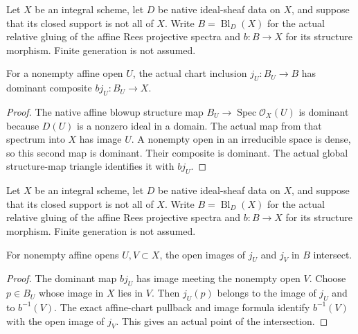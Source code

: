\begingroup

Let $X$ be an integral scheme, let $D$ be native ideal-sheaf
data on $X$, and suppose that its closed support is not all
of $X$. Write $B=\operatorname{Bl}_D(X)$ for the actual
relative gluing of the affine Rees projective spectra and
$b:B\to X$ for its structure morphism. Finite generation is
not assumed.

\begin{lemma}
\label{lem:global-blowup-integral-chart-dominant}
\leanok
For a nonempty affine open $U$, the actual chart inclusion
$j_U:B_U\to B$ has dominant composite $b j_U:B_U\to X$.
\end{lemma}
\begin{proof}
The native affine blowup structure map $B_U\to
\operatorname{Spec}\mathcal O_X(U)$ is dominant because
$D(U)$ is a nonzero ideal in a domain. The actual map from
that spectrum into $X$ has image $U$. A nonempty open in
an irreducible space is dense, so this second map is
dominant. Their composite is dominant. The actual global
structure-map triangle identifies it with $b j_U$.
\end{proof}

\endgroup

\begingroup

Let $X$ be an integral scheme, let $D$ be native ideal-sheaf
data on $X$, and suppose that its closed support is not all
of $X$. Write $B=\operatorname{Bl}_D(X)$ for the actual
relative gluing of the affine Rees projective spectra and
$b:B\to X$ for its structure morphism. Finite generation is
not assumed.

\begin{lemma}
\label{lem:global-blowup-integral-chart-intersections}
\leanok
For nonempty affine opens $U,V\subset X$, the open images
of $j_U$ and $j_V$ in $B$ intersect.
\end{lemma}
\begin{proof}
The dominant map $b j_U$ has image meeting the nonempty
open $V$. Choose $p\in B_U$ whose image in $X$ lies in
$V$. Then $j_U(p)$ belongs to the image of $j_U$ and
to $b^{-1}(V)$. The exact affine-chart pullback and image
formula identify $b^{-1}(V)$ with the open image of
$j_V$. This gives an actual point of the intersection.
\end{proof}

